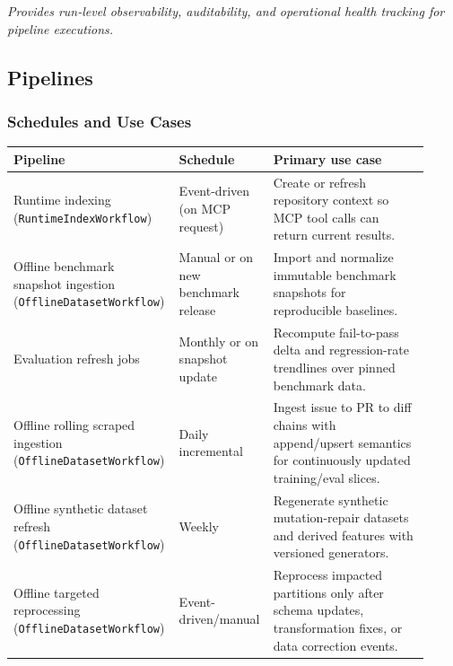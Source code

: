 \documentclass[a4paper,12pt]{article}
\begin{document}
\noindent \textit{Provides run-level observability, auditability, and operational health tracking for pipeline executions.}

\subsection{Pipelines}

\subsubsection{Schedules and Use Cases}

\begin{table}[H]
\centering
\footnotesize
\begin{tabular}{@{} >{\raggedright\arraybackslash}p{0.35\linewidth} >{\raggedright\arraybackslash}p{0.20\linewidth} >{\raggedright\arraybackslash}p{0.37\linewidth} @{}}
\toprule
\textbf{Pipeline} & \textbf{Schedule} & \textbf{Primary use case} \\
\midrule
Runtime indexing (\texttt{RuntimeIndexWorkflow}) & Event-driven (on MCP request) & Create or refresh repository context so MCP tool calls can return current results. \\
Offline benchmark snapshot ingestion (\texttt{OfflineDatasetWorkflow}) & Manual or on new benchmark release & Import and normalize immutable benchmark snapshots for reproducible baselines. \\
Evaluation refresh jobs & Monthly or on snapshot update & Recompute fail-to-pass delta and regression-rate trendlines over pinned benchmark data. \\
Offline rolling scraped ingestion (\texttt{OfflineDatasetWorkflow}) & Daily incremental & Ingest issue to PR to diff chains with append/upsert semantics for continuously updated training/eval slices. \\
Offline synthetic dataset refresh (\texttt{OfflineDatasetWorkflow}) & Weekly & Regenerate synthetic mutation-repair datasets and derived features with versioned generators. \\
Offline targeted reprocessing (\texttt{OfflineDatasetWorkflow}) & Event-driven/manual & Reprocess impacted partitions only after schema updates, transformation fixes, or data correction events. \\
\bottomrule
\end{tabular}
\end{table}
\end{document}
